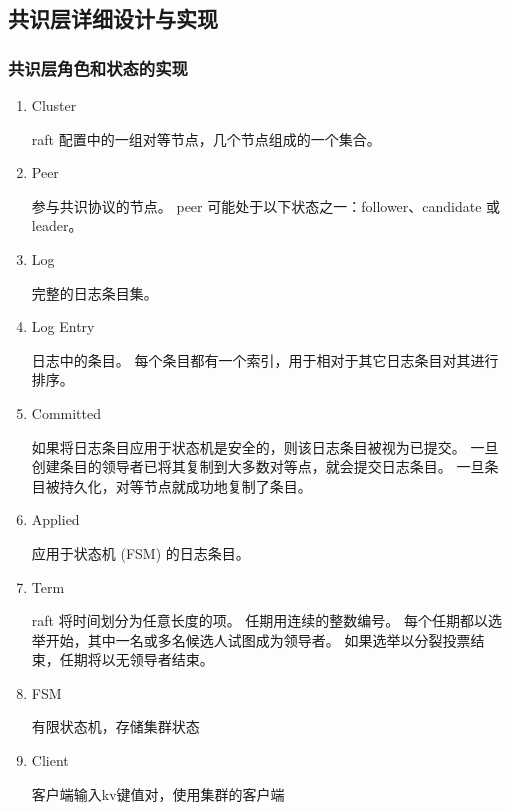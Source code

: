 \subsection{共识层详细设计与实现}
		\subsubsection{共识层角色和状态的实现}
			\begin{enumerate}
				\item Cluster 
				 
					raft 配置中的一组对等节点，几个节点组成的一个集合。

				\item Peer
				
					参与共识协议的节点。 peer 可能处于以下状态之一：follower、candidate 或 leader。

				\item Log
					
					完整的日志条目集。
				\item Log Entry 
				
					日志中的条目。 每个条目都有一个索引，用于相对于其它日志条目对其进行排序。
				\item Committed 
				
					如果将日志条目应用于状态机是安全的，则该日志条目被视为已提交。 
					一旦创建条目的领导者已将其复制到大多数对等点，就会提交日志条目。 
					一旦条目被持久化，对等节点就成功地复制了条目。
				\item Applied 
					
					应用于状态机 (FSM) 的日志条目。
				\item Term 

					raft 将时间划分为任意长度的项。 
					任期用连续的整数编号。 
					每个任期都以选举开始，其中一名或多名候选人试图成为领导者。 
					如果选举以分裂投票结束，任期将以无领导者结束。
				\item FSM 
					
					有限状态机，存储集群状态
				\item Client

					客户端输入kv键值对，使用集群的客户端
			\end{enumerate}

		
